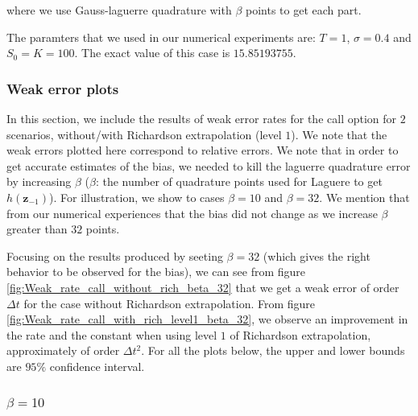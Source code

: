 \documentclass[11pt]{article}
\begin{document}
where we use Gauss-laguerre quadrature with $\beta$ points to get each part.

The paramters that we used in our numerical experiments are: $T=1$, $\sigma=0.4$ and $S_0=K=100$. The exact value of this case is $15.85193755$.











\subsubsection{Weak error plots} \label{sec:Weak error plots_call}



In this section, we include the results of weak error rates for  the call option for $2$ scenarios, without/with Richardson extrapolation (level $1$). We note that the weak errors plotted here correspond to relative errors.  We note that in order to get accurate estimates of the bias, we needed to kill the laguerre quadrature error by increasing $\beta$ ($\beta$: the number of quadrature points used for Laguere to get $h(\mathbf{z}_{-1})$). For illustration, we show to cases $\beta=10$ and $\beta=32$. We mention that from our numerical experiences that the bias did not change as we increase $\beta$ greater than $32$ points.

Focusing on the results produced by seeting $\beta=32$ (which gives the right behavior to be observed for the bias), we can see from figure \ref{fig:Weak_rate_call_without_rich_beta_32} that we get a weak error of order $\Delta t$ for the case without Richardson extrapolation. From figure \ref{fig:Weak_rate_call_with_rich_level1_beta_32}, we observe an improvement in the rate and the constant when using level $1$ of Richardson extrapolation, approximately of order $\Delta t^2$. For all the plots below, the upper and lower bounds are $95\%$ confidence interval.



\subsubsection*{$\beta=10$}
\end{document}
